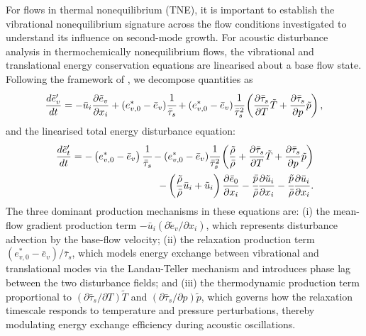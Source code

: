 For flows in thermal nonequilibrium (\gls{TNE}), it is important to establish the vibrational nonequilibrium signature across the flow conditions investigated to understand its influence on second-mode growth. For acoustic disturbance analysis in thermochemically nonequilibrium flows, the vibrational and translational energy conservation equations are linearised about a base flow state. Following the framework of \citet{WagnildEtAl2012}, we decompose quantities as  \begin{equation}\label{equation:vibrational_disturbance}
\frac{d\tilde{e}_v'}{dt} = -\bar{u}_i \frac{\partial \tilde{e}_{v}}{\partial x_i} + (e_{v,0}^* - \bar{e}_v) \cfrac{1}{\bar{\tau}_{s}} + (e_{v,0}^* - \bar{e}_v) \cfrac{1}{\bar{\tau}_{s}^2} \left( \frac{\partial \bar{\tau}_s}{\partial T} \tilde{T} + \frac{\partial \bar{\tau}_s}{\partial p} \tilde{p} \right),
\end{equation} and the linearised total energy disturbance equation: \begin{equation}\label{equation:translational_disturbance}
\begin{split}
\frac{d\tilde{e}_t'}{dt} = -\left(e_{v,0}^* - \bar{e}_v\right) \cfrac{1}{\bar{\tau}_{s}} - (e_{v,0}^* - \bar{e}_v) \cfrac{1}{\bar{\tau}_{s}^2} \left( \frac{\tilde{\rho}}{\bar{\rho}} + \frac{\partial \bar{\tau}_s}{\partial T} \tilde{T} + \frac{\partial \bar{\tau}_s}{\partial p} \tilde{p} \right) \\
- \left( \frac{\tilde{\rho}}{\bar{\rho}} \bar{u}_{i} + \tilde{u}_i \right) \frac{\partial \bar{e}_0}{\partial x_i} - \cfrac{\bar{p}}{\bar{\rho}} \frac{\partial \tilde{u}_i}{\partial x_i} - \cfrac{\tilde{p}}{\bar{\rho}} \frac{\partial \bar{u}_{i}}{\partial x_i}.
\end{split}
\end{equation}
The three dominant production mechanisms in these equations are: (i) the mean-flow gradient production term $-\bar{u}_i (\partial \tilde{e}_{v}/\partial x_i)$, which represents disturbance advection by the base-flow velocity; (ii) the relaxation production term $(e_{v,0}^* - \bar{e}_v)/\bar{\tau}_s$, which models energy exchange between vibrational and translational modes via the Landau-Teller mechanism and introduces phase lag between the two disturbance fields; and (iii) the thermodynamic production term proportional to $(\partial \bar{\tau}_s/\partial T) \tilde{T}$ and $(\partial \bar{\tau}_s/\partial p) \tilde{p}$, which governs how the relaxation timescale responds to temperature and pressure perturbations, thereby modulating energy exchange efficiency during acoustic oscillations.

